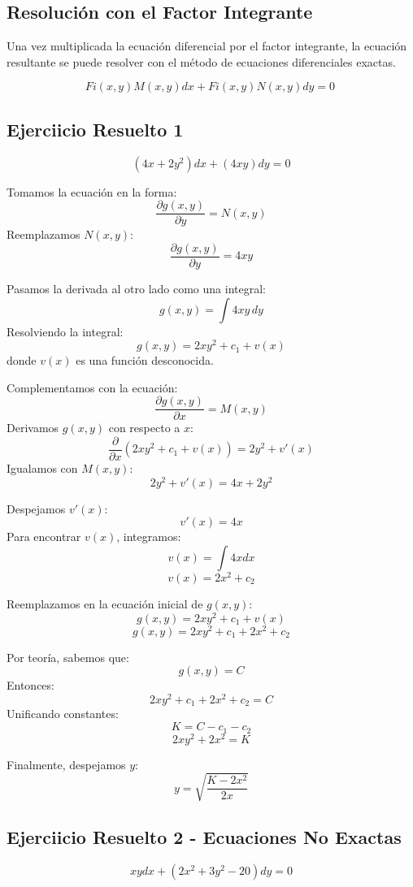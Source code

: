 \subsection*{Resolución con el Factor Integrante}

Una vez multiplicada la ecuación diferencial por el factor integrante, la ecuación resultante se puede resolver con el método de ecuaciones diferenciales exactas.

\[
   Fi( x,y) M( x,y) dx+Fi( x,y) N( x,y) dy=0\ 
    \]

    
\subsection{Ejerciicio Resuelto 1}


\[
(4x+2y^{2})dx + (4xy)dy = 0
\]

Tomamos la ecuación en la forma:
\[
\frac{\partial g( x,y)}{\partial y} = N( x,y)
\]
Reemplazamos \( N(x,y) \):
\[
\frac{\partial g( x,y)}{\partial y} = 4xy
\]

Pasamos la derivada al otro lado como una integral:
\[
g( x,y) = \int 4xy \, dy
\]
Resolviendo la integral:
\[
g( x,y) = 2xy^{2} + c_{1} + v( x)
\]
donde \( v(x) \) es una función desconocida.

Complementamos con la ecuación:
\[
\frac{\partial g( x,y)}{\partial x} = M( x,y)
\]
Derivamos \( g(x,y) \) con respecto a \( x \):
\[
\frac{\partial}{\partial x} \left( 2xy^{2} + c_{1} + v(x) \right) = 2y^{2} + v'(x)
\]
Igualamos con \( M(x,y) \):
\[
2y^{2} + v'(x) = 4x+ 2y^{2}
\]

Despejamos \( v'(x) \):
\[
v'(x) = 4x
\]
Para encontrar \( v(x) \), integramos:
\[
v( x) = \int 4x dx
\]
\[
v( x) = 2x^{2} + c_{2}
\]

Reemplazamos en la ecuación inicial de \( g(x,y) \):
\[
g( x,y) = 2xy^{2} + c_{1} + v( x)
\]
\[
g( x,y) = 2xy^{2} + c_{1} + 2x^{2} + c_{2}
\]

Por teoría, sabemos que:
\[
g( x,y) = C
\]
Entonces:
\[
2xy^{2} + c_{1} + 2x^{2} + c_{2} = C
\]
Unificando constantes:
\[
K = C - c_{1} - c_{2}
\]
\[
2xy^{2} + 2x^{2} = K
\]

Finalmente, despejamos \( y \):
\[
y = \sqrt{\frac{K - 2x^{2}}{2x}}
\]


\subsection{Ejerciicio Resuelto 2 - Ecuaciones No Exactas}

\[
xydx + \left( 2x^{2} +3y^{2} -20\right) dy = 0
\]

